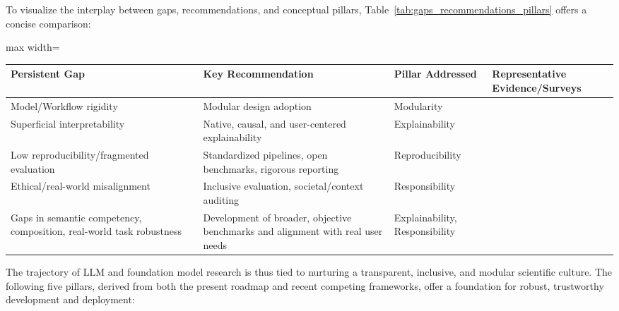 \documentclass[sigconf]{acmart}
\begin{document}
To visualize the interplay between gaps, recommendations, and conceptual pillars, Table~\ref{tab:gaps_recommendations_pillars} offers a concise comparison:

\begin{table*}[htbp]
\centering
\caption{Summary of Persistent Gaps, Key Recommendations, and Foundational Pillars in Foundation Model Research}
\label{tab:gaps_recommendations_pillars}
\begin{adjustbox}{max width=\textwidth}
\begin{tabular}{@{}llll@{}}
\toprule
\textbf{Persistent Gap} & \textbf{Key Recommendation} & \textbf{Pillar Addressed} & \textbf{Representative Evidence/Surveys} \\
\midrule
Model/Workflow rigidity & Modular design adoption & Modularity & \cite{ref78,ref86,ref87,ref98,ref100,ref101,ref102} \\
Superficial interpretability & Native, causal, and user-centered explainability & Explainability & \cite{ref9,ref31,ref36,ref49,ref50,ref51,ref55,ref83,ref93} \\
Low reproducibility/fragmented evaluation & Standardized pipelines, open benchmarks, rigorous reporting & Reproducibility & \cite{ref81,ref83,ref91,ref92,ref95,ref97,ref99,ref106,ref107,ref108} \\
Ethical/real-world misalignment & Inclusive evaluation, societal/context auditing & Responsibility & \cite{ref93,ref94,ref96,ref98,ref104,ref107,ref108} \\
Gaps in semantic competency, composition, real-world task robustness & Development of broader, objective benchmarks and alignment with real user needs & Explainability, Responsibility & \cite{ref55,ref94,ref96,ref105} \\
\bottomrule
\end{tabular}
\end{adjustbox}
\end{table*}

The trajectory of LLM and foundation model research is thus tied to nurturing a transparent, inclusive, and modular scientific culture. The following five pillars, derived from both the present roadmap and recent competing frameworks, offer a foundation for robust, trustworthy development and deployment:
\end{document}
